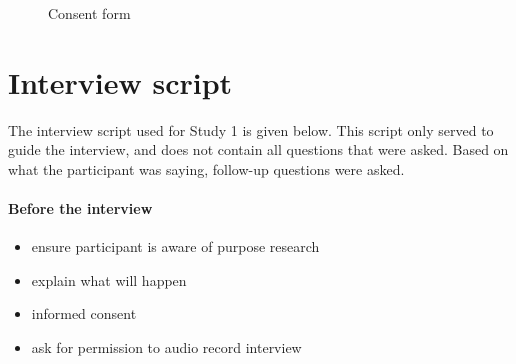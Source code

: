 \begin{figure}[htp] 
\caption{Consent form}
\label{fig:consentform}
\end{figure} 

\chapter{Interview script}\label{ch:interviewscript}
The interview script used for Study 1 is given below. This script only served to guide the interview, and does not contain all questions that were asked. Based on what the participant was saying, follow-up questions were asked. 

\subsubsection{Before the interview}
\begin{itemize}
\item 
ensure participant is aware of purpose research 
\item 
explain what will happen
\item 
informed consent
\item 
ask for permission to audio record interview
\end{itemize}
